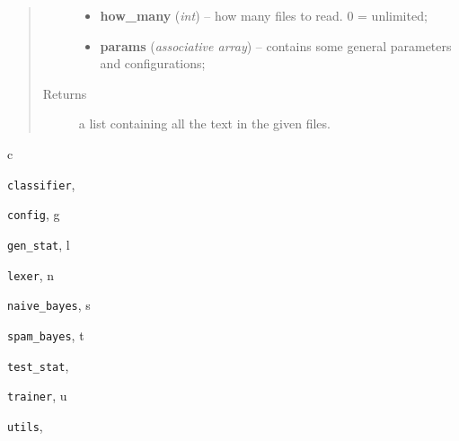 \documentclass[letterpaper,10pt,english]{sphinxmanual}
\begin{document}
\begin{fulllineitems}
\begin{fulllineitems}
\begin{quote}
\begin{description}
\begin{itemize}
\item {} 
\textbf{how\_many} (\emph{int}) -- how many files to read. 0 = unlimited;

\item {} 
\textbf{params} (\emph{associative array}) -- contains some general parameters and configurations;

\end{itemize}

\item[{Returns}] \leavevmode
a list containing all the text in the given files.

\end{description}\end{quote}

\end{fulllineitems}


\end{fulllineitems}



\renewcommand{\indexname}{Python Module Index}
\begin{theindex}
\def\bigletter#1{{\Large\sffamily#1}\nopagebreak\vspace{1mm}}
\bigletter{c}
\item {\texttt{classifier}}, \pageref{index:module-classifier}
\item {\texttt{config}}, \pageref{index:module-config}
\indexspace
\bigletter{g}
\item {\texttt{gen\_stat}}, \pageref{index:module-gen_stat}
\indexspace
\bigletter{l}
\item {\texttt{lexer}}, \pageref{index:module-lexer}
\indexspace
\bigletter{n}
\item {\texttt{naive\_bayes}}, \pageref{index:module-naive_bayes}
\indexspace
\bigletter{s}
\item {\texttt{spam\_bayes}}, \pageref{index:module-spam_bayes}
\indexspace
\bigletter{t}
\item {\texttt{test\_stat}}, \pageref{index:module-test_stat}
\item {\texttt{trainer}}, \pageref{index:module-trainer}
\indexspace
\bigletter{u}
\item {\texttt{utils}}, \pageref{index:module-utils}
\end{theindex}

\renewcommand{\indexname}{Index}
\printindex
\end{document}
